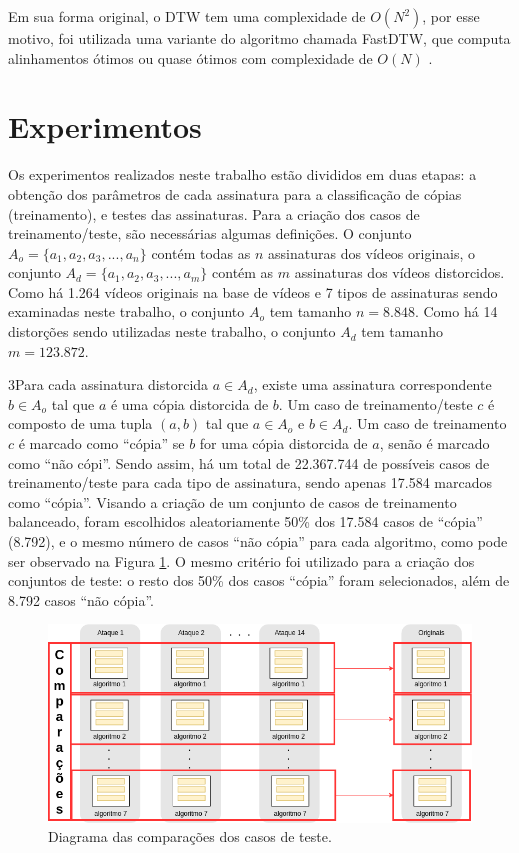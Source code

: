
Em sua forma original, o DTW tem uma complexidade de $ O(N^{2}) $, por esse motivo, foi utilizada uma variante do algoritmo chamada FastDTW, que computa alinhamentos ótimos ou quase ótimos com complexidade de $O(N)$ \cite{salvador2007toward}.


\section{Experimentos}
\label{sec:met-Experimentos}

Os experimentos realizados neste trabalho estão divididos em duas etapas: a obtenção dos parâmetros de cada assinatura para a classificação de cópias (treinamento), e testes das assinaturas. Para a criação dos casos de treinamento/teste, são necessárias algumas definições. O conjunto $A_o = \{a_1, a_2, a_3, ..., a_n\}$ contém todas as $n$ assinaturas dos vídeos originais, o conjunto $A_d = \{a_1, a_2, a_3, ..., a_m\}$ contém as $m$ assinaturas dos vídeos distorcidos. Como há 1.264 vídeos originais na base de vídeos e 7 tipos de assinaturas sendo examinadas neste trabalho, o conjunto $A_o$ tem tamanho $n=8.848$. Como há 14 distorções sendo utilizadas neste trabalho, o conjunto $A_d$ tem tamanho $m=123.872$.

3Para cada assinatura distorcida $a \in A_d$, existe uma assinatura correspondente $b \in A_o$ tal que $a$ é uma cópia distorcida de $b$. Um caso de treinamento/teste $c$ é composto de uma tupla $(a, b)$ tal que $a \in A_o$ e $b \in A_d$. Um caso de treinamento $c$ é marcado como ``cópia'' se $b$ for uma cópia distorcida de $a$, senão é marcado como ``não cópi''. Sendo assim, há um total de 22.367.744 de possíveis casos de treinamento/teste para cada tipo de assinatura, sendo apenas 17.584 marcados como ``cópia''. Visando a criação de um conjunto de casos de treinamento balanceado, foram escolhidos aleatoriamente 50\% dos 17.584 casos de ``cópia'' (8.792), e o mesmo número de casos ``não cópia'' para cada algoritmo, como pode ser observado na Figura \ref{fig:comparacao}. O mesmo critério foi utilizado para a criação dos conjuntos de teste: o resto dos 50\% dos casos ``cópia'' foram selecionados, além de 8.792 casos ``não cópia''.

\begin{figure}[h]
    \centering
    \caption{Diagrama das comparações dos casos de teste.}
    \label{fig:comparacao}
    \includegraphics[width=1.0\textwidth]{dados/figuras/Comparador-1}
\end{figure}

